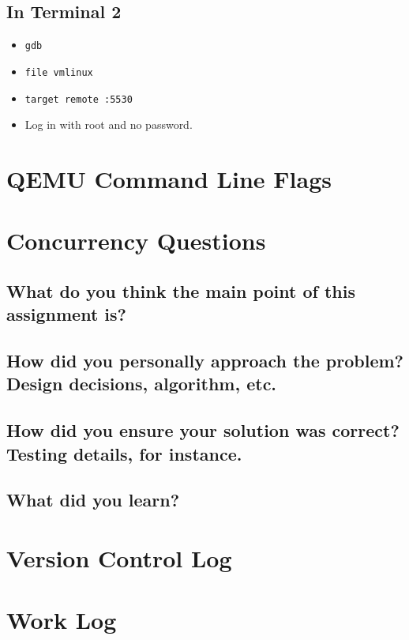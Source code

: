 \documentclass[letterpaper,10pt,titlepage]{article}
\begin{document}
\subsection{In Terminal 2}
\begin{itemize}
   \item \verb|gdb|
   \item \verb|file vmlinux|
   \item \verb|target remote :5530|
   \item Log in with root and no password.
\end{itemize}



\section{QEMU Command Line Flags}


\section{Concurrency Questions}

\subsection{What do you think the main point of this assignment is?}

\subsection{How did you personally approach the problem? Design decisions, algorithm, etc.}

\subsection{How did you ensure your solution was correct? Testing details, for instance.}

\subsection{What did you learn?}


\section{Version Control Log} 




\section{Work Log}
\end{document}
